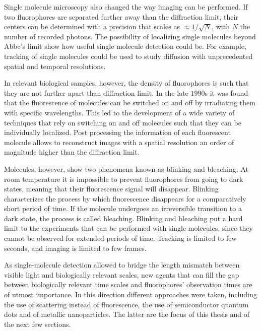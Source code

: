 Single molecule microscopy also changed the way imaging can be performed. If two
fluorophores are separated further away than the diffraction limit, their
centers can be determined with a precision that scales as $\approx 1/\sqrt{N}$,
with $N$ the number of recorded photons. The possibility of localizing single
molecules beyond Abbe's limit show how useful single molecule detection could
be. For example, tracking of single molecules\cite{Schmidt1996} could be used to
study diffusion with unprecedented spatial and temporal resolutions.

In relevant biological samples, however, the density of fluorophores is such
that they are not further apart than diffraction limit. In the late $1990$s it
was found that the fluorescence of molecules can be switched on and off by
irradiating them with specific wavelengths\cite{Moerner1997}. This led to the
development of a wide variety of techniques that rely on switching on and off
molecules\cite{Betzig2006} such that they can be individually
localized\cite{Dertinger2009}. Post processing the information of each
fluorescent molecule allows to reconstruct images with a spatial resolution an
order of magnitude higher than the diffraction limit\cite{Moerner2007}.

Molecules, however, show two phenomena known as blinking\cite{Orrit2010} and
bleaching\cite{Zondervan2004}. At room temperature it is impossible to prevent
fluorophores from going to dark states, meaning that their fluorescence signal
will disappear. Blinking characterizes the process by which fluorescence
disappears for a comparatively short period of time. If the molecule undergoes
an irreversible transition to a dark state, the process is called bleaching.
Blinking and bleaching put a hard limit to the experiments that can be performed
with single molecules, since they cannot be observed for extended periods of
time. Tracking is limited to few seconds, and imaging is limited to few frames.

As single-molecule detection allowed to bridge the length mismatch between
visible light and biologically relevant scales, new agents that can fill the gap
between biologically relevant time scales and fluorophores' observation times
are of utmost importance. In this direction different approaches were taken,
including the use of scattering instead of
fluorescence\cite{ortega2012interferometric}, the use of semiconductor quantum
dots\cite{alivisatos2005quantum} and of metallic
nanoparticles\cite{huang2009gold}. The latter are the focus of this thesis and
of the next few sections.

